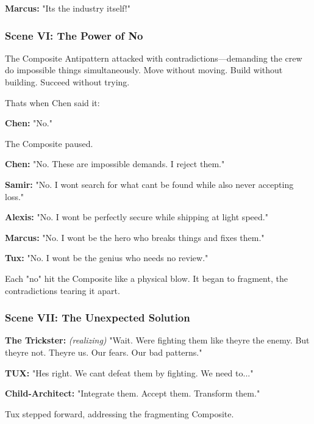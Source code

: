 \textbf{Marcus:} "It\textquotesingle s the industry itself!"

\bookdivider

\subsubsection{Scene VI: The Power of \textquotesingle No\textquotesingle{}}\label{scene-vi-the-power-of-no}

The Composite Antipattern attacked with contradictions---demanding the crew do impossible things simultaneously. Move without moving. Build without building. Succeed without trying.

That\textquotesingle s when Chen said it:

\textbf{Chen:} "No."

The Composite paused.

\textbf{Chen:} "No. These are impossible demands. I reject them."

\textbf{Samir:} "No. I won\textquotesingle t search for what can\textquotesingle t be found while also never accepting loss."

\textbf{Alexis:} "No. I won\textquotesingle t be perfectly secure while shipping at light speed."

\textbf{Marcus:} "No. I won\textquotesingle t be the hero who breaks things and fixes them."

\textbf{Tux:} "No. I won\textquotesingle t be the genius who needs no review."

Each "no" hit the Composite like a physical blow. It began to fragment, the contradictions tearing it apart.

\bookdivider

\subsubsection{Scene VII: The Unexpected Solution}\label{scene-vii-the-unexpected-solution}

\textbf{The Trickster:} \emph{(realizing)} "Wait. We\textquotesingle re fighting them like they\textquotesingle re the enemy. But they\textquotesingle re not. They\textquotesingle re us. Our fears. Our bad patterns."

\textbf{TUX:} "He\textquotesingle s right. We can\textquotesingle t defeat them by fighting. We need to..."

\textbf{Child-Architect:} "Integrate them. Accept them. Transform them."

Tux stepped forward, addressing the fragmenting Composite.

